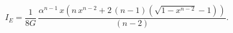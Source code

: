 \begin{equation}
I_{E}=\frac{1}{8G}\,{\frac {{\alpha}^{n-1}\,x\left
(n\,{x}^{n-2}+2\,(n-1)\left(\sqrt {1-{x}^{n-2}}-1\right)\right)}{\left
(n-2\right )}} .\label{ACTION}
\end{equation}

